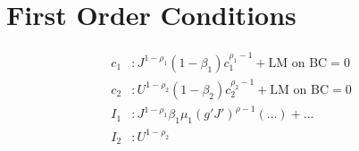 \documentclass[10pt]{article}
\begin{document}
\section{First Order Conditions}

  \begin{align*}
    c_1 &: J^{1 - \rho_1} (1 - \beta_1) c_1^{\rho_1 - 1} + \text{LM on BC} = 0 \\
    c_2 &: U^{1 - \rho_2} (1 - \beta_2) c_2^{\rho_2 - 1} + \text{LM on BC} = 0 \\
    I_1 &: J^{1 - \rho_1} \beta_1 \mu_1(g' J')^{\rho - 1} (...) + \text{...} \\
    I_2 &: U^{1 - \rho_2}
  \end{align*}
\end{document}
